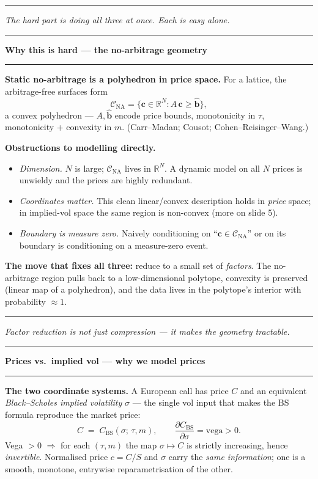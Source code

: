 \documentclass[12pt]{article}
\newcommand{\slide}[1]{%
  \par\noindent\rule{\linewidth}{1.2pt}\par\vspace{2pt}%
  {\LARGE\bfseries #1}\par\vspace{2pt}%
  \noindent\rule{\linewidth}{0.5pt}\par\vspace{8pt}}
\newcommand{\footer}[1]{\vfill\noindent\rule{\linewidth}{0.3pt}\par
  {\small\itshape #1}}
\newcommand{\R}{\mathbb{R}}
\newcommand{\cC}{\mathcal{C}}
\begin{document}
\footer{The hard part is doing all three at once. Each is easy alone.}
\clearpage

\slide{Why this is hard --- the no-arbitrage geometry}

\textbf{Static no-arbitrage is a polyhedron in price space.}
For a lattice, the arbitrage-free surfaces form
\[
\cC_{\mathrm{NA}} = \{\mathbf c \in \R^N : A\,\mathbf c \ge \mathbf{\hat b}\},
\]
a convex polyhedron --- $A,\mathbf{\hat b}$ encode price bounds, monotonicity
in $\tau$, monotonicity + convexity in $m$. (Carr--Madan; Cousot;
Cohen--Reisinger--Wang.)

\vspace{6pt}
\textbf{Obstructions to modelling directly.}
\begin{itemize}
\item \emph{Dimension.} $N$ is large; $\cC_{\mathrm{NA}}$ lives in $\R^N$.
  A dynamic model on all $N$ prices is unwieldy and the prices are highly
  redundant.
\item \emph{Coordinates matter.} This clean linear/convex description holds
  in \emph{price} space; in implied-vol space the same region is non-convex
  (more on slide 5).
\item \emph{Boundary is measure zero.} Naively conditioning on
  ``$\mathbf c \in \cC_{\mathrm{NA}}$'' or on its boundary is conditioning
  on a measure-zero event.
\end{itemize}

\vspace{6pt}
\textbf{The move that fixes all three:} reduce to a small set of
\emph{factors}. The no-arbitrage region pulls back to a low-dimensional
polytope, convexity is preserved (linear map of a polyhedron), and the data
lives in the polytope's interior with probability $\approx 1$.

\footer{Factor reduction is not just compression --- it makes the geometry tractable.}
\clearpage

\slide{Prices vs.\ implied vol --- why we model prices}

\textbf{The two coordinate systems.} A European call has price $C$ and an
equivalent \emph{Black--Scholes implied volatility} $\sigma$ --- the single
vol input that makes the BS formula reproduce the market price:
\[
C \;=\; C_{\mathrm{BS}}(\sigma;\,\tau,m), \qquad
\frac{\partial C_{\mathrm{BS}}}{\partial\sigma}=\text{vega}>0 .
\]
Vega $>0$ $\Rightarrow$ for each $(\tau,m)$ the map $\sigma\mapsto C$ is
strictly increasing, hence \emph{invertible}. Normalised price
$c=C/S$ and $\sigma$ carry the \emph{same information}; one is a smooth,
monotone, entrywise reparametrisation of the other.
\end{document}
